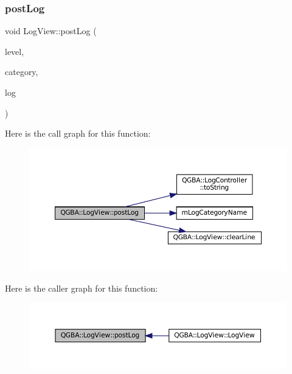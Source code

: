 \subsubsection{\texorpdfstring{post\+Log}{postLog}}
{\footnotesize\ttfamily void Log\+View\+::post\+Log (\begin{DoxyParamCaption}\item[{\mbox{\hyperlink{ioapi_8h_a787fa3cf048117ba7123753c1e74fcd6}{int}}}]{level,  }\item[{\mbox{\hyperlink{ioapi_8h_a787fa3cf048117ba7123753c1e74fcd6}{int}}}]{category,  }\item[{const Q\+String \&}]{log }\end{DoxyParamCaption})\hspace{0.3cm}{\ttfamily [slot]}}

Here is the call graph for this function\+:
\nopagebreak
\begin{figure}[H]
\begin{center}
\leavevmode
\includegraphics[width=350pt]{class_q_g_b_a_1_1_log_view_ac55c68cf058ed26900803ad7bec30445_cgraph}
\end{center}
\end{figure}
Here is the caller graph for this function\+:
\nopagebreak
\begin{figure}[H]
\begin{center}
\leavevmode
\includegraphics[width=350pt]{class_q_g_b_a_1_1_log_view_ac55c68cf058ed26900803ad7bec30445_icgraph}
\end{center}
\end{figure}
\mbox{\label{class_q_g_b_a_1_1_log_view_a7c661fd0b6316bc62f71df6c39a1a715}} 
